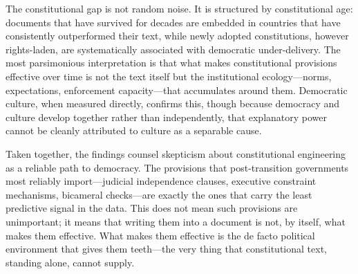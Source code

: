 \documentclass[9pt,twoside]{pnas-new}
\begin{document}
The constitutional gap is not random noise. It is structured by constitutional age: documents that have survived for decades are embedded in countries that have consistently outperformed their text, while newly adopted constitutions, however rights-laden, are systematically associated with democratic under-delivery. The most parsimonious interpretation is that what makes constitutional provisions effective over time is not the text itself but the institutional ecology---norms, expectations, enforcement capacity---that accumulates around them. Democratic culture, when measured directly, confirms this, though because democracy and culture develop together rather than independently, that explanatory power cannot be cleanly attributed to culture as a separable cause.

Taken together, the findings counsel skepticism about constitutional engineering as a reliable path to democracy. The provisions that post-transition governments most reliably import---judicial independence clauses, executive constraint mechanisms, bicameral checks---are exactly the ones that carry the least predictive signal in the data. This does not mean such provisions are unimportant; it means that writing them into a document is not, by itself, what makes them effective. What makes them effective is the de facto political environment that gives them teeth---the very thing that constitutional text, standing alone, cannot supply.



\showacknow


\end{document}
